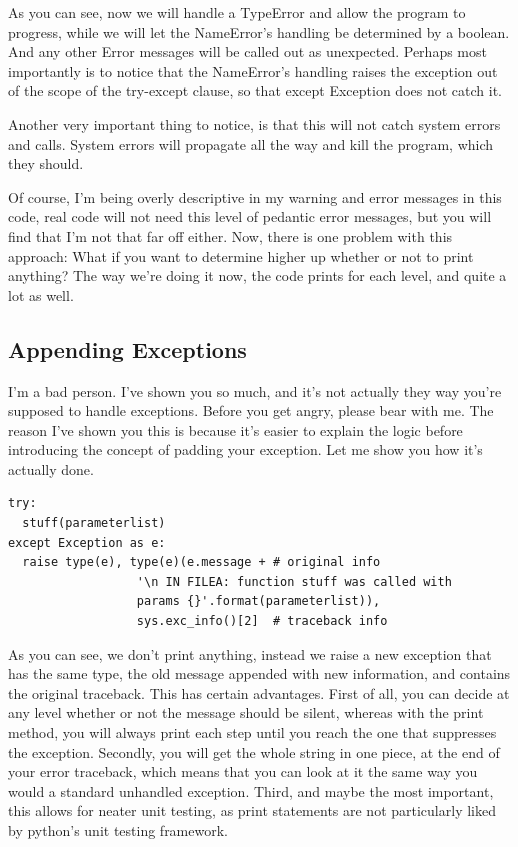 \documentclass[10pt,a4paper]{article}
\begin{document}
As you can see, now we will handle a TypeError and allow the program to progress, while we will let the NameError's handling be determined by a boolean. And any other Error messages will be called out as unexpected. Perhaps most importantly is to notice that the NameError's handling raises the exception out of the scope of the try-except clause, so that except Exception does not catch it.

Another very important thing to notice, is that this will not catch system errors and calls. System errors will propagate all the way and kill the program, which they should. 

Of course, I'm being overly descriptive in my warning and error messages in this code, real code will not need this level of pedantic error messages, but you will find that I'm not that far off either. Now, there is one problem with this approach: What if you want to determine higher up whether or not to print anything? The way we're doing it now, the code prints for each level, and quite a lot as well.

\subsection{Appending Exceptions}

I'm a bad person. I've shown you so much, and it's not actually they way you're supposed to handle exceptions. Before you get angry, please bear with me. The reason I've shown you this is because it's easier to explain the logic before introducing the concept of padding your exception. Let me show you how it's actually done.

\begin{lstlisting}
try: 
  stuff(parameterlist)
except Exception as e:
  raise type(e), type(e)(e.message + # original info
                  '\n IN FILEA: function stuff was called with 
                  params {}'.format(parameterlist)), 
                  sys.exc_info()[2]  # traceback info
\end{lstlisting}

As you can see, we don't print anything, instead we raise a new exception that has the same type, the old message appended with new information, and contains the original traceback. This has certain advantages. First of all, you can decide at any level whether or not the message should be silent, whereas with the print method, you will always print each step until you reach the one that suppresses the exception. Secondly, you will get the whole string in one piece, at the end of your error traceback, which means that you can look at it the same way you would a standard unhandled exception. Third, and maybe the most important, this allows for neater unit testing, as print statements are not particularly liked by python's unit testing framework. 
\end{document}
